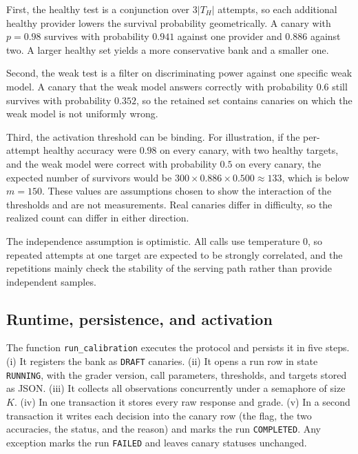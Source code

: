 First, the healthy test is a conjunction over $3|T_H|$ attempts, so each
additional healthy provider lowers the survival probability geometrically. A
canary with $p = 0.98$ survives with probability $0.941$ against one provider
and $0.886$ against two. A larger healthy set yields a more conservative bank
and a smaller one.

Second, the weak test is a filter on discriminating power against one specific
weak model. A canary that the weak model answers correctly with probability
$0.6$ still survives with probability $0.352$, so the retained set contains
canaries on which the weak model is not uniformly wrong.

Third, the activation threshold can be binding. For illustration, if the
per-attempt healthy accuracy were $0.98$ on every canary, with two healthy
targets, and the weak model were correct with probability $0.5$ on every
canary, the expected number of survivors would be $300 \times 0.886 \times
0.500 \approx 133$, which is below $m = 150$. These values are assumptions
chosen to show the interaction of the thresholds and are not measurements. Real
canaries differ in difficulty, so the realized count can differ in either
direction.

The independence assumption is optimistic. All calls use temperature $0$, so
repeated attempts at one target are expected to be strongly correlated, and the
repetitions mainly check the stability of the serving path rather than provide
independent samples.

\subsection{Runtime, persistence, and activation}
\label{sec:calibration_runtime}

The function \texttt{run\_calibration} executes the protocol and persists it in
five steps. (i) It registers the bank as \texttt{DRAFT} canaries. (ii) It
opens a run row in state \texttt{RUNNING}, with the grader version, call
parameters, thresholds, and targets stored as JSON. (iii) It collects all
observations concurrently under a semaphore of size $K$. (iv) In one
transaction it stores every raw response and grade. (v) In a second
transaction it writes each decision into the canary row (the flag, the two
accuracies, the status, and the reason) and marks the run \texttt{COMPLETED}. Any
exception marks the run \texttt{FAILED} and leaves canary statuses unchanged.

